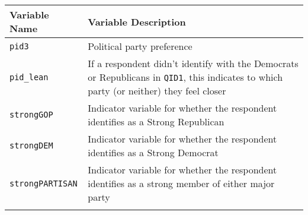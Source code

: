 \documentclass[
]{article}
\begin{document}
\begin{longtable}[]{@{}ll@{}}
\toprule
\begin{minipage}[b]{0.33\columnwidth}\raggedright
Variable Name\strut
\end{minipage} & \begin{minipage}[b]{0.61\columnwidth}\raggedright
Variable Description\strut
\end{minipage}\tabularnewline
\midrule
\endhead
\begin{minipage}[t]{0.33\columnwidth}\raggedright
\texttt{pid3}\strut
\end{minipage} & \begin{minipage}[t]{0.61\columnwidth}\raggedright
Political party preference\strut
\end{minipage}\tabularnewline
\begin{minipage}[t]{0.33\columnwidth}\raggedright
\texttt{pid\_lean}\strut
\end{minipage} & \begin{minipage}[t]{0.61\columnwidth}\raggedright
If a respondent didn't identify with the Democrats or Republicans in
\texttt{QID1}, this indicates to which party (or neither) they feel
closer\strut
\end{minipage}\tabularnewline
\begin{minipage}[t]{0.33\columnwidth}\raggedright
\texttt{strongGOP}\strut
\end{minipage} & \begin{minipage}[t]{0.61\columnwidth}\raggedright
Indicator variable for whether the respondent identifies as a Strong
Republican\strut
\end{minipage}\tabularnewline
\begin{minipage}[t]{0.33\columnwidth}\raggedright
\texttt{strongDEM}\strut
\end{minipage} & \begin{minipage}[t]{0.61\columnwidth}\raggedright
Indicator variable for whether the respondent identifies as a Strong
Democrat\strut
\end{minipage}\tabularnewline
\begin{minipage}[t]{0.33\columnwidth}\raggedright
\texttt{strongPARTISAN}\strut
\end{minipage} & \begin{minipage}[t]{0.61\columnwidth}\raggedright
Indicator variable for whether the respondent identifies as a strong
member of either major party\strut
\end{minipage}\tabularnewline
\begin{minipage}[t]{0.33\columnwidth}\raggedright

\end{minipage}
\end{longtable}
\end{document}
